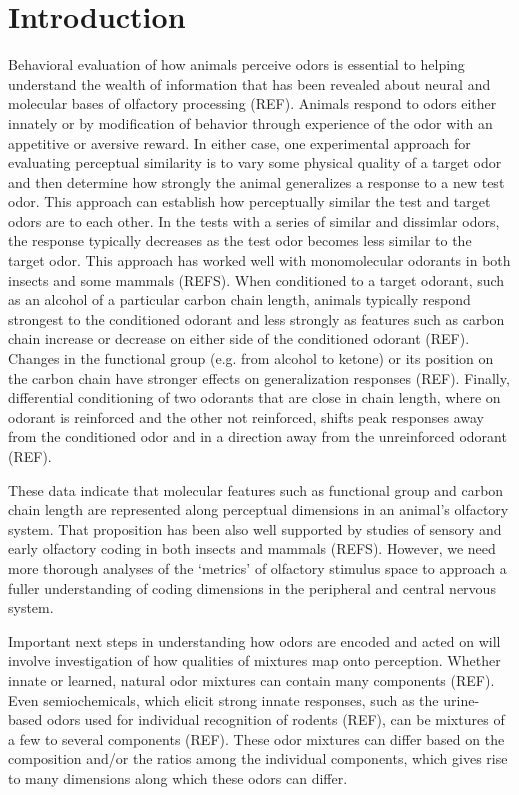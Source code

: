 \section*{Introduction}
\label{sec:introduction}

Behavioral evaluation of how animals perceive odors is essential to helping understand the wealth of information that has been revealed about neural and molecular bases of olfactory processing (REF). 
Animals respond to odors either innately or by modification of behavior through experience of the odor with an appetitive or aversive reward. 
In either case, one experimental approach for evaluating perceptual similarity is to vary some physical quality of a target odor and then determine how strongly the animal generalizes a response to a new test odor. 
This approach can establish how perceptually similar the test and target odors are to each other. 
In the tests with a series of similar and dissimlar odors, the response typically decreases as the test odor becomes less similar to the target odor. 
This approach has worked well with monomolecular odorants in both insects and some mammals (REFS). 
When conditioned to a target odorant, such as an alcohol of a particular carbon chain length, animals typically respond strongest to the conditioned odorant and less strongly as features such as carbon chain increase or decrease on either side of the conditioned odorant (REF). 
Changes in the functional group (e.g. from alcohol to ketone) or its position on the carbon chain have stronger effects on generalization responses (REF). 
Finally, differential conditioning of two odorants that are close in chain length, where on odorant is reinforced and the other not reinforced, shifts peak responses away from the conditioned odor and in a direction away from the unreinforced odorant (REF). 

These data indicate that molecular features such as functional group and carbon chain length are represented along perceptual dimensions in an animal’s olfactory system. 
That proposition has been also well supported by studies of sensory and early olfactory coding in both insects and mammals (REFS). 
 However, we need more thorough analyses of the ‘metrics’ of olfactory stimulus space to approach a fuller understanding of coding dimensions in the peripheral and central nervous system. 
 
 Important next steps in understanding how odors are encoded and acted on will involve investigation of how qualities of mixtures map onto perception. Whether innate or learned, natural odor mixtures can contain many components (REF). Even semiochemicals, which elicit strong innate responses, such as the urine-based odors used for individual recognition of rodents (REF), can be mixtures of a few to several components (REF). These odor mixtures can differ based on the composition and/or the ratios among the individual components, which gives rise to many dimensions along which these odors can differ.  
 
